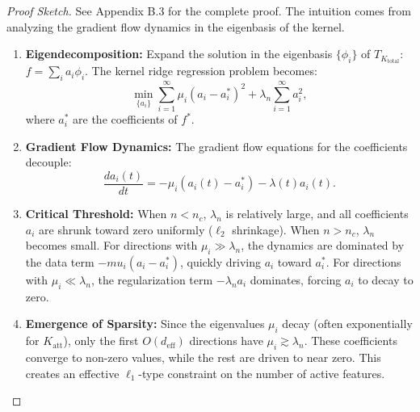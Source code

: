 	\begin{proof}[Proof Sketch]
		See Appendix B.3 for the complete proof. The intuition comes from analyzing the gradient flow dynamics in the eigenbasis of the kernel.
		\begin{enumerate}
			\item \textbf{Eigendecomposition:} Expand the solution in the eigenbasis \(\{\phi_i\}\) of \(T_{K_{\text{total}}}\): \(f = \sum_i a_i \phi_i\). The kernel ridge regression problem becomes:
			\begin{equation}
				\min_{\{a_i\}} \sum_{i=1}^\infty \mu_i (a_i - a_i^*)^2 + \lambda_n \sum_{i=1}^\infty a_i^2,
			\end{equation}
			where \(a_i^*\) are the coefficients of \(f^*\).
			
			\item \textbf{Gradient Flow Dynamics:} The gradient flow equations for the coefficients decouple:
			\begin{equation}
				\frac{da_i(t)}{dt} = -\mu_i (a_i(t) - a_i^*) - \lambda(t) a_i(t).
				\label{eq:coeff_flow}
			\end{equation}
			
			\item \textbf{Critical Threshold:} When \(n < n_c\), \(\lambda_n\) is relatively large, and all coefficients \(a_i\) are shrunk toward zero uniformly (\(\ell_2\) shrinkage). When \(n > n_c\), \(\lambda_n\) becomes small. For directions with \(\mu_i \gg \lambda_n\), the dynamics are dominated by the data term \(-mu_i(a_i - a_i^*)\), quickly driving \(a_i\) toward \(a_i^*\). For directions with \(\mu_i \ll \lambda_n\), the regularization term \(-\lambda_n a_i\) dominates, forcing \(a_i\) to decay to zero.
			
			\item \textbf{Emergence of Sparsity:} Since the eigenvalues \(\mu_i\) decay (often exponentially for \(K_{\text{att}}\)), only the first \(O(d_{\text{eff}})\) directions have \(\mu_i \gtrsim \lambda_n\). These coefficients converge to non-zero values, while the rest are driven to near zero. This creates an effective \(\ell_1\)-type constraint on the number of active features.
		\end{enumerate}
	\end{proof}
	
